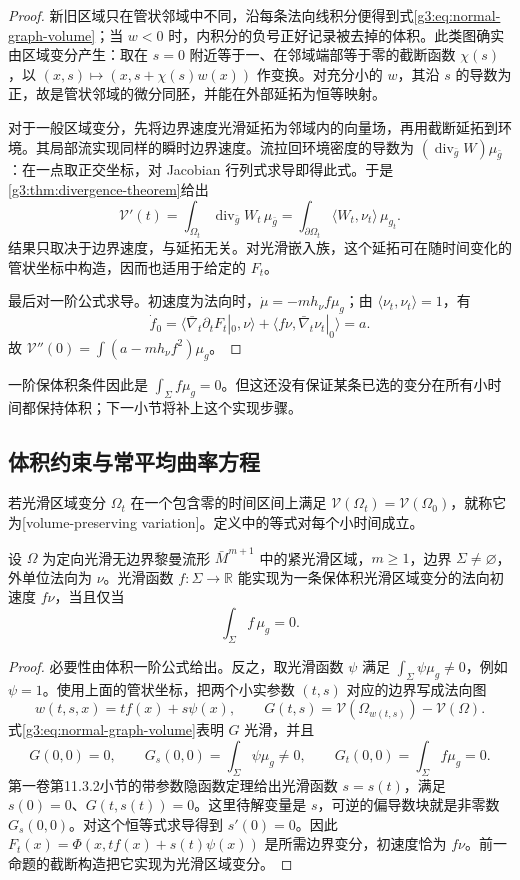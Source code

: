 \begin{proof}
	新旧区域只在管状邻域中不同，沿每条法向线积分便得到式\eqref{g3:eq:normal-graph-volume}；当 \(w<0\) 时，内积分的负号正好记录被去掉的体积。此类图确实由区域变分产生：取在 \(s=0\) 附近等于一、在邻域端部等于零的截断函数 \(\chi(s)\)，以
	\((x,s)\mapsto(x,s+\chi(s)w(x))\)
	作变换。对充分小的 \(w\)，其沿 \(s\) 的导数为正，故是管状邻域的微分同胚，并能在外部延拓为恒等映射。

	对于一般区域变分，先将边界速度光滑延拓为邻域内的向量场，再用截断延拓到环境。其局部流实现同样的瞬时边界速度。流拉回环境密度的导数为 \((\operatorname{div}_{\bar g}W)\mu_{\bar g}\)：在一点取正交坐标，对 Jacobian 行列式求导即得此式。于是\cref{g3:thm:divergence-theorem}给出
	\[
		\mathcal V'(t)=\int_{\Omega_t}\operatorname{div}_{\bar g}W_t\,\mu_{\bar g}
		=\int_{\partial\Omega_t}\langle W_t,\nu_t\rangle\,\mu_{g_t}.
	\]
	结果只取决于边界速度，与延拓无关。对光滑嵌入族，这个延拓可在随时间变化的管状坐标中构造，因而也适用于给定的 \(F_t\)。

	最后对一阶公式求导。初速度为法向时，\(\dot\mu=-m h_\nu f\mu_g\)；由 \(\langle\nu_t,\nu_t\rangle=1\)，有
	\[
		\dot f_0
		=\langle\bar\nabla_t\partial_tF_t|_0,\nu\rangle
		+\langle f\nu,\bar\nabla_t\nu_t|_0\rangle=a.
	\]
	故 \(\mathcal V''(0)=\int(a-m h_\nu f^2)\mu_g\)。
\end{proof}

一阶保体积条件因此是 \(\int_\Sigma f\mu_g=0\)。但这还没有保证某条已选的变分在所有小时间都保持体积；下一小节将补上这个实现步骤。

\subsection{体积约束与常平均曲率方程}
\label{g3:subsec:1905:02}
若光滑区域变分 \(\Omega_t\) 在一个包含零的时间区间上满足 \(\mathcal V(\Omega_t)=\mathcal V(\Omega_0)\)，就称它为[volume-preserving variation]。定义中的等式对每个小时间成立。

\begin{lemma}\label{g3:lem:exact-volume-preserving-variation}
	设 \(\Omega\) 为定向光滑无边界黎曼流形 \(\bar M^{m+1}\) 中的紧光滑区域，\(m\ge1\)，边界 \(\Sigma\ne\varnothing\)，外单位法向为 \(\nu\)。光滑函数 \(f:\Sigma\to\mathbb R\) 能实现为一条保体积光滑区域变分的法向初速度 \(f\nu\)，当且仅当
	\[
		\int_\Sigma f\,\mu_g=0.
	\]
\end{lemma}
\begin{proof}
	必要性由体积一阶公式给出。反之，取光滑函数 \(\psi\) 满足 \(\int_\Sigma\psi\mu_g\ne0\)，例如 \(\psi=1\)。使用上面的管状坐标，把两个小实参数 \((t,s)\) 对应的边界写成法向图
	\[
		w(t,s,x)=t f(x)+s\psi(x),
		\qquad G(t,s)=\mathcal V(\Omega_{w(t,s)})-\mathcal V(\Omega).
	\]
	式\eqref{g3:eq:normal-graph-volume}表明 \(G\) 光滑，并且
	\[
		G(0,0)=0,\qquad
		G_s(0,0)=\int_\Sigma\psi\mu_g\ne0,\qquad
		G_t(0,0)=\int_\Sigma f\mu_g=0.
	\]
	第一卷第11.3.2小节的带参数隐函数定理给出光滑函数 \(s=s(t)\)，满足 \(s(0)=0\)、\(G(t,s(t))=0\)。这里待解变量是 \(s\)，可逆的偏导数块就是非零数 \(G_s(0,0)\)。对这个恒等式求导得到 \(s'(0)=0\)。因此
	\(F_t(x)=\Phi(x,t f(x)+s(t)\psi(x))\)
	是所需边界变分，初速度恰为 \(f\nu\)。前一命题的截断构造把它实现为光滑区域变分。
\end{proof}

